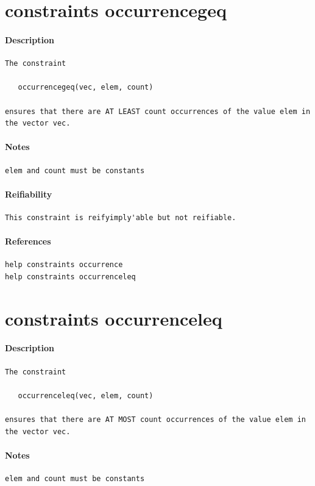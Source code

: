 \documentclass[oneside]{book}
\begin{document}
\section{constraints occurrencegeq}
\paragraph{Description}
{\footnotesize
\begin{verbatim}
The constraint

   occurrencegeq(vec, elem, count)

ensures that there are AT LEAST count occurrences of the value elem in
the vector vec.
\end{verbatim}
}
\paragraph{Notes}
{\footnotesize
\begin{verbatim}
elem and count must be constants
\end{verbatim}
}
\paragraph{Reifiability}
{\footnotesize
\begin{verbatim}
This constraint is reifyimply'able but not reifiable.
\end{verbatim}
}
\paragraph{References}
{\footnotesize
\begin{verbatim}
help constraints occurrence
help constraints occurrenceleq
\end{verbatim}
}
\section{constraints occurrenceleq}
\paragraph{Description}
{\footnotesize
\begin{verbatim}
The constraint

   occurrenceleq(vec, elem, count)

ensures that there are AT MOST count occurrences of the value elem in
the vector vec.
\end{verbatim}
}
\paragraph{Notes}
{\footnotesize
\begin{verbatim}
elem and count must be constants
\end{verbatim}
}
\end{document}
